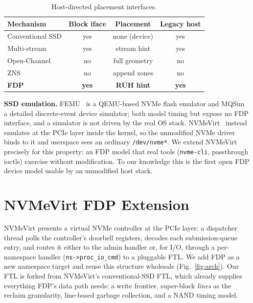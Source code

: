 \documentclass[conference,10pt]{IEEEtran}
\begin{document}
\begin{table}[t]
\centering
\caption{Host-directed placement interfaces.}
\label{tab:taxonomy}
\footnotesize
\begin{tabular}{lccc}
\toprule
Mechanism & Block iface & Placement & Legacy host \\
\midrule
Conventional SSD            & yes & none (device) & yes \\
Multi-stream~\cite{multistream:hotstorage14} & yes & stream hint & yes \\
Open-Channel~\cite{lightnvm:fast17} & no  & full geometry & no \\
ZNS~\cite{zns:atc21}        & no  & append zones  & no \\
\textbf{FDP}~\cite{fdp:tp4146} & \textbf{yes} & \textbf{RUH hint} & \textbf{yes} \\
\bottomrule
\end{tabular}
\end{table}

\textbf{SSD emulation.} FEMU~\cite{femu:fast18} is a QEMU-based NVMe flash
emulator and MQSim~\cite{mqsim:fast18} a detailed discrete-event device
simulator; both model timing but expose no FDP interface, and a simulator is not
driven by the real OS stack. NVMeVirt~\cite{nvmevirt:fast23} instead emulates at
the PCIe layer inside the kernel, so the unmodified NVMe driver binds to it and
userspace sees an ordinary \texttt{/dev/nvme*}. We extend NVMeVirt precisely for
this property: an FDP model that real tools (\texttt{nvme-cli}, passthrough
ioctls) exercise without modification. To our knowledge this is the first open
FDP device model usable by an unmodified host stack.

\section{NVMeVirt FDP Extension}
\label{sec:design}
NVMeVirt presents a virtual NVMe controller at the PCIe layer: a dispatcher
thread polls the controller's doorbell registers, decodes each submission-queue
entry, and routes it either to the admin handler or, for I/O, through a
per-namespace handler (\texttt{ns->proc\_io\_cmd}) to a pluggable FTL. We add FDP
as a new namespace target and reuse this structure wholesale
(Fig.~\ref{fig:arch}). Our FTL is forked from NVMeVirt's conventional-SSD FTL,
which already supplies everything FDP's data path needs: a write frontier,
super-block \emph{lines} as the reclaim granularity, line-based garbage
collection, and a NAND timing model.
\end{document}
